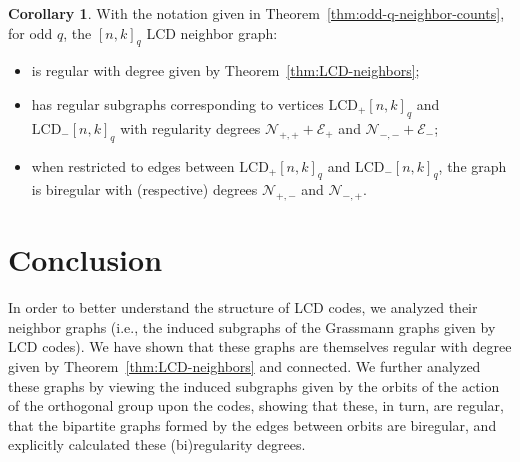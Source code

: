 \documentclass[11pt]{article}
\theoremstyle{definition}
\newtheorem{corollary}[theorem]{Corollary}
\newcommand{\LCDpq}[2]{\mathrm{LCD}_+ {[#1, #2]}_q}
\newcommand{\LCDnq}[2]{\mathrm{LCD}_- {[#1, #2]}_q}
\newcommand{\CurE}{\mathcal{E}}
\newcommand{\CurN}{\mathcal{N}}
\begin{document}
\begin{corollary}\label{cor:qOddproperties}
	With the notation given in Theorem~\ref{thm:odd-q-neighbor-counts}, for odd $q$, the ${[n, k]}_q$ LCD neighbor graph:
	\begin{itemize}
		\item is regular with degree given by Theorem~\ref{thm:LCD-neighbors};
		\item has regular subgraphs corresponding to vertices $\LCDpq{n}{k}$ and $\LCDnq{n}{k}$ with regularity degrees $\CurN_{+, +} + \CurE_+$ and $\CurN_{-, -} + \CurE_-$;
		\item when restricted to edges between $\LCDpq{n}{k}$ and $\LCDnq{n}{k}$, the graph is biregular with (respective) degrees $\CurN_{+, -}$ and $\CurN_{-, +}$.
	\end{itemize}
\end{corollary}


\section{Conclusion}\label{sec:Conclusions}

In order to better understand the structure of LCD codes, we analyzed their neighbor graphs (i.e., the induced subgraphs of the Grassmann graphs given by LCD codes).
We have shown that these graphs are themselves regular with degree given by Theorem~\ref{thm:LCD-neighbors} and connected.
We further analyzed these graphs by viewing the induced subgraphs given by the orbits of the action of the orthogonal group upon the codes, showing that these, in turn, are regular, that the bipartite graphs formed by the edges between orbits are biregular, and explicitly calculated these (bi)regularity degrees.


\printbibliography[heading=bibnumbered]{}

\end{document}
